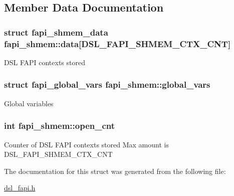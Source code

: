 \subsection{Member Data Documentation}
\hypertarget{structfapi__shmem_a790da050e59940c76878a18af361e72c}{
\subsubsection[{data}]{\setlength{\rightskip}{0pt plus 5cm}struct {\bf fapi\-\_\-shmem\-\_\-data} fapi\-\_\-shmem\-::data\mbox{[}D\-S\-L\-\_\-\-F\-A\-P\-I\-\_\-\-S\-H\-M\-E\-M\-\_\-\-C\-T\-X\-\_\-\-C\-N\-T\mbox{]}}}\label{structfapi__shmem_a790da050e59940c76878a18af361e72c}
D\-S\-L F\-A\-P\-I contexts stored \hypertarget{structfapi__shmem_af7ee2d7aa3f9a4097e53353ee942f372}{
\subsubsection[{global\-\_\-vars}]{\setlength{\rightskip}{0pt plus 5cm}struct {\bf fapi\-\_\-global\-\_\-vars} fapi\-\_\-shmem\-::global\-\_\-vars}}\label{structfapi__shmem_af7ee2d7aa3f9a4097e53353ee942f372}
Global variables \hypertarget{structfapi__shmem_a5732da0ec59d14cecd04eb88c4b48816}{
\subsubsection[{open\-\_\-cnt}]{\setlength{\rightskip}{0pt plus 5cm}int fapi\-\_\-shmem\-::open\-\_\-cnt}}\label{structfapi__shmem_a5732da0ec59d14cecd04eb88c4b48816}
Counter of D\-S\-L F\-A\-P\-I contexts stored Max amount is D\-S\-L\-\_\-\-F\-A\-P\-I\-\_\-\-S\-H\-M\-E\-M\-\_\-\-C\-T\-X\-\_\-\-C\-N\-T 

The documentation for this struct was generated from the following file\-:\begin{DoxyCompactItemize}
\item 
\hyperlink{dsl__fapi_8h}{dsl\-\_\-fapi.\-h}\end{DoxyCompactItemize}
